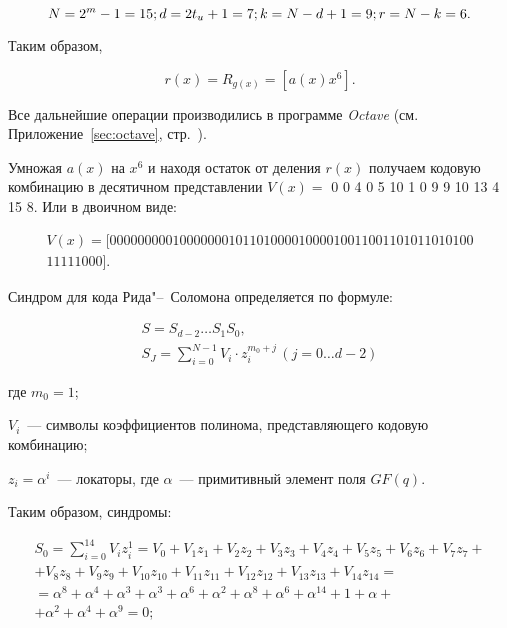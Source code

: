 \begin{equation*}
  N = 2^m - 1 = 15;\\
  d = 2t_u + 1 = 7;\\
  k = N - d + 1 = 9;\\
  r = N - k = 6.
\end{equation*}

Таким образом,

\begin{equation*}
  r(x) = R_{g(x)} = \left[a(x)x^6\right].
\end{equation*}

Все дальнейшие операции производились в программе \textit{Octave}
(см. Приложение~\ref{sec:octave}, стр.~\pageref{page3}).

Умножая $a(x)$ на $x^6$ и находя остаток от деления $r(x)$ получаем
кодовую комбинацию в десятичном представлении
$V(x) =$ 0    0    4    0    5   10    1    0    9    9   10   13    4
15    8. Или в двоичном виде:

\begin{gather*}
  V(x) = [0000000001000000010110100001000010011001101011010100\\
  11111000].
\end{gather*}

Синдром для кода Рида"--~Соломона определяется по формуле:

\begin{gather*}
  S = S_{d-2} \ldots S_1S_0,\\
  S_J = \sum _{i=0} ^{N-1} V_i \cdot z_i^{m_0+j} \, (j = 0
  \ldots d-2)
\end{gather*}

\begin{ESKDexplanation}
\item[где ] $m_0 = 1$;
\item $V_i$~--- символы коэффициентов полинома, представляющего
  кодовую комбинацию;
\item $z_i = \alpha^i$~--- локаторы, где $\alpha$~--- примитивный
  элемент поля $GF(q)$.
\end{ESKDexplanation}

Таким образом, синдромы:

\begin{gather*}
  S_0 = \sum_{i = 0}^{14}V_iz_i^1 = V_0 + V_1z_1 + V_2z_2 + V_3z_3 +
  V_4z_4 + V_5z_5 + V_6z_6 + V_7z_7 + \\ + V_8z_8 + V_9z_9 +
  V_{10}z_{10} + V_{11}z_{11} + V_{12}z_{12} + V_{13}z_{13} +
  V_{14}z_{14} =  \\ = \alpha^8 + \alpha^4 + \alpha^3 + \alpha^3 +
  \alpha^6 + \alpha^2 + \alpha^8 + \alpha^6 + \alpha^{14} + 1 + \alpha
  + \\ + \alpha^2 + \alpha^4 + \alpha^9 = 0;
\end{gather*}

